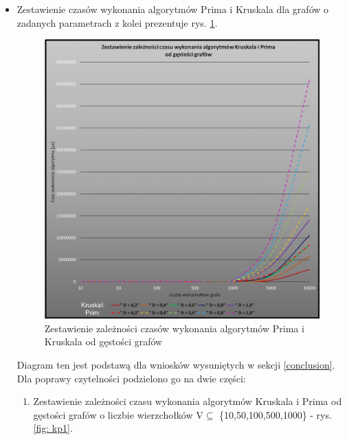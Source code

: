 \begin{itemize}
\item Zestawienie czasów wykonania algorytmów Prima i Kruskala dla grafów o zadanych parametrach z kolei prezentuje rys. \ref{fig: pk1}.
	\begin{figure}[htb!]
	\centering
	\includegraphics[width=1\textwidth]{tex/fig/kp1}
	\caption{Zestawienie zależności czasów wykonania algorytmów Prima i Kruskala od gęstości grafów}
	\label{fig: pk1}
\end{figure}
\newpage
Diagram ten jest podstawą dla wniosków wysuniętych w sekcji \ref{conclusion}. Dla poprawy czytelności podzielono go na dwie części:
\begin{enumerate}
	\item Zestawienie zależności czasu wykonania algorytmów Kruskala i Prima od gęstości grafów o liczbie wierzchołków V$\subseteq$ \{10,50,100,500,1000\} - rys. \ref{fig: kp1}.
	

\end{enumerate}
\end{itemize}
